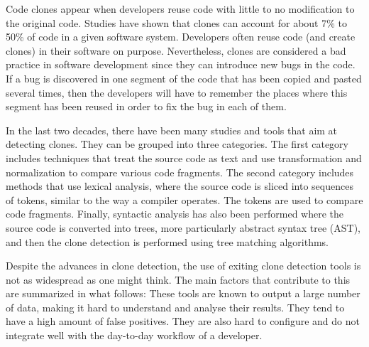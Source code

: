 \documentclass[conference]{IEEEtran}
\begin{document}
Code clones appear when developers reuse code with little to no modification to the original code.
Studies have shown  that clones can account for about 7\% to 50\% of code in a given software system\cite{Baker, StephaneDucasse}.
Developers often reuse code (and create clones) in their software on purpose\cite{Kim2005}.
Nevertheless, clones are considered a bad practice in software development since they can introduce new bugs in the code\cite{Kapser2006,Juergens2009,Li2006}.
If a  bug is discovered in one segment of the code that has been copied and pasted several times, then the developers will have to remember the places where this segment has been reused in order to fix the bug in each of them.

In the last two decades, there have been many studies and tools that aim at detecting clones. They can be grouped into three categories.
The first category includes techniques that treat the source code as text and use transformation and normalization  to compare various code fragments\cite{Johnson1994,Johnson1993, Cordy2011, Roy2008}.
The second category includes methods that
use lexical analysis, where the source code is sliced into sequences of tokens, similar to the way a compiler operates\cite{Baker,Bakera,Baker2002,Kamiya2002,Li2006}.
The tokens are used to compare code fragments.
Finally, syntactic analysis has also been performed where the source code is converted into trees, more particularly abstract syntax tree (AST), and then the clone detection is performed using tree matching algorithms\cite{Baxter1998, Komondoor2000, Tairas2006, Falke2008}.

Despite the advances in clone detection, the use of exiting clone detection tools is not as widespread as one might think.
The main factors that contribute to this are summarized in what follows\cite{Johnson2013}: These tools are known to output a large number of data, making it hard to understand and analyse their results.
They tend to have a high amount of false positives.
They are also hard to configure and do not integrate well with the day-to-day workflow of a developer.
\end{document}
